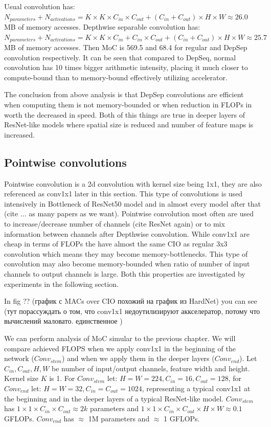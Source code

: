 Usual convolution has: $ N_{parameters} + N_{activations} = K \times K \times C_{in} \times C_{out} + (C_{in} + C_{out}) \times H \times W \approx 26.0$ MB of memory accesses. Depthwise separable convolution has: $ N_{parameters} + N_{activations} = K \times K \times C_{in} + C_{in} \times C_{out} + (C_{in} + C_{out}) \times H \times W \approx 25.7$ MB of memory accesses. Then MoC is 569.5 and 68.4 for regular and DepSep convolution respectively. It can be seen that compared to DepSeq, normal convolution has 10 times bigger arithmetic intensity, placing it much closer to compute-bound than to memory-bound effectively utilizing accelerator. 

The conclusion from above analysis is that DepSep convolutions are efficient when computing them is not memory-bounded or when reduction in FLOPs in worth the decreased in speed. Both of this things are true in deeper layers of ResNet-like models where spatial size is reduced and number of feature maps is increased. 

\subsection{Pointwise convolutions}

Pointwise convolution is a 2d convolution with kernel size being 1x1, they are also referenced as conv1x1 later in this section. This type of convolutions is used intensively in Bottleneck of ResNet50 model and in almost every model after that (cite ... as many papers as we want). Pointwise convolution most often are used to increase/decrease number of channels (cite ResNet again) or to mix information between channels after Depthwise convolution. While conv1x1 are cheap in terms of FLOPs the have almost the same CIO as regular 3x3 convolution which means they may become memory-bottlenecks. This type of convolution may also become memory-bounded when ratio of number of input channels to output channels is large. Both this properties are investigated by experiments in the following section.

In fig ?? (график с MACs over CIO похожий на график из HardNet) you can see 
(тут порассуждать о том, что conv1x1 недоутилизируют аккселератор, потому что вычислений маловато. единственное )

We can perform analysis of MoC simular to the previous chapter. We will compare achieved FLOPS when we apply conv1x1 in the beginning of the network ($Conv_{stem}$) and when we apply them in the deeper layers ($Conv_{end}$). Let $C_{in}, C_{out}, H, W$ be number of input/output channels, feature width and height. Kernel size $K$ is 1. For $Conv_{stem}$ let:  $H=W=224, C_{in} = 16, C_{out}=128$, for $Conv_{end}$ let: $H=W=32, C_{in} = C_{out}=1024$, representing a typical conv1x1 at the beginning and in the deeper layers of a typical ResNet-like model.
$Conv_{stem}$ has $ 1 \times 1 \times C_{in} \times C_{out} \approx 2k$ parameters and $ 1 \times 1 \times C_{in} \times C_{out} \times H \times W \approx 0.1 $ GFLOPs. $Conv_{end}$ has $\approx$ 1M parameters and $\approx$ 1 GFLOPs. 

